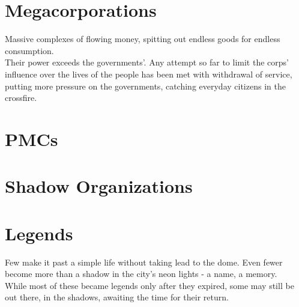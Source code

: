 \documentclass[11pt,a4paper,openany,dvipsnames]{book}
\begin{document}
	
	
	\chapter{Megacorporations}
	Massive complexes of flowing money, spitting out endless goods for endless consumption.
	\\%
	Their power exceeds the governments'.
	Any attempt so far to limit the corps' influence over the lives of the people has been met with withdrawal of service, putting more pressure on the governments, catching everyday citizens in the crossfire.
	
	
	\chapter{PMCs}
	
	
	
	\chapter{Shadow Organizations}
	
	
	\chapter{Legends}
	Few make it past a simple life without taking lead to the dome.
	Even fewer become more than a shadow in the city's neon lights - a name, a memory.
	\\%
	While most of these became legends only after they expired, some may still be out there, in the shadows, awaiting the time for their return.
	
	
\end{document}
